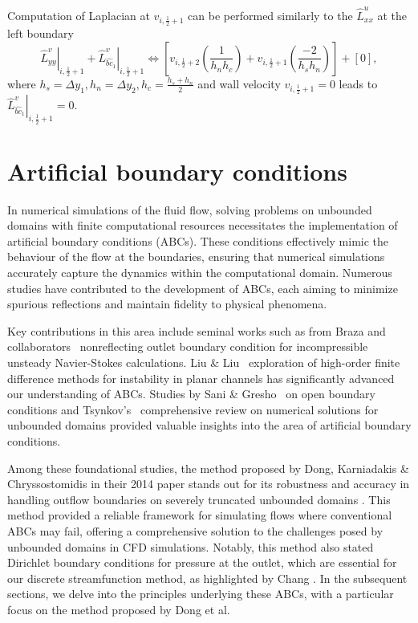 \documentclass{article}
\numberwithin{equation}{section}
\begin{document}
Computation of Laplacian at $v_{i,\frac{1}{2}+1}$ can be performed similarly to the $\hat{L}_{xx}^u$ at the left boundary 
\begin{equation}
	\left.\hat{L}_{yy}^v\right|_{i,\frac{1}{2}+1}+\left.\hat{L}^v_{\hat{bc}_1}\right|_{i,\frac{1}{2}+1} \iff  \left [v_{i,\frac{1}{2}+2}\left(\frac{1}{h_n h_c}\right)+v_{i,\frac{1}{2}+1}\left(\frac{-2}{h_s h_n}\right)\right]+\left[0\right],
\end{equation}
where $h_s={\Delta y_1},h_n=\Delta y_2,h_c=\frac{h_s+h_n}{2}$ and wall velocity $v_{i,\frac{1}{2}+1}=0$ leads to $\left.\hat{L}^v_{\hat{bc}_1}\right|_{i,\frac{1}{2}+1}=0$.












\pagebreak
\section{Artificial boundary conditions}\label{sec:artificial-bc}

In numerical simulations of the fluid flow, solving problems on unbounded domains with finite computational resources necessitates the implementation of artificial boundary conditions (ABCs). These conditions effectively mimic the behaviour of the flow at the boundaries, ensuring that numerical simulations accurately capture the dynamics within the computational domain. Numerous studies have contributed to the development of ABCs, each aiming to minimize spurious reflections and maintain fidelity to physical phenomena.

Key contributions in this area include seminal works such as from Braza and collaborators~\cite{Jin:1993, Kourta:1987,Persillon:1998}  nonreflecting outlet boundary condition for incompressible unsteady Navier-Stokes calculations. Liu \& Liu~\cite{Liu:1993} exploration of high-order finite difference methods for instability in planar channels has significantly advanced our understanding of ABCs. Studies by Sani \& Gresho~\cite{Sani:1994} on open boundary conditions and Tsynkov's~\cite{Tsynkov:1998} comprehensive review on numerical solutions for unbounded domains  provided valuable insights into the area of artificial boundary conditions.

Among these foundational studies, the method proposed by Dong, Karniadakis \& Chryssostomidis in their 2014 paper stands out for its robustness and accuracy in handling outflow boundaries on severely truncated unbounded domains \cite{Dong:2014}. This method provided a reliable framework for simulating flows where conventional ABCs may fail, offering a comprehensive solution to the challenges posed by unbounded domains in CFD simulations. Notably, this method also stated Dirichlet boundary conditions for pressure at the outlet, which are essential for our discrete streamfunction method, as highlighted by Chang \cite{Chang:2002}. In the subsequent sections, we delve into the principles underlying these ABCs, with a particular focus on the method proposed by Dong et al. 
\end{document}
